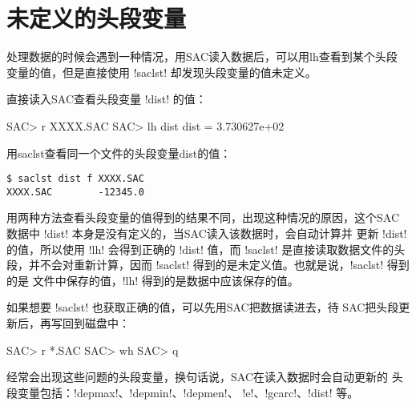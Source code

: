 \section{未定义的头段变量}
处理数据的时候会遇到一种情况，用SAC读入数据后，可以用lh查看到某个头段
变量的值，但是直接使用 !saclst! 却发现头段变量的值未定义。

直接读入SAC查看头段变量 !dist! 的值：
\begin{SACCode}
SAC> r XXXX.SAC
SAC> lh dist
     dist = 3.730627e+02
\end{SACCode}

用saclst查看同一个文件的头段变量dist的值：
\begin{verbatim}
$ saclst dist f XXXX.SAC
XXXX.SAC        -12345.0
\end{verbatim}

用两种方法查看头段变量的值得到的结果不同，出现这种情况的原因，这个SAC
数据中 !dist! 本身是没有定义的，当SAC读入该数据时，会自动计算并
更新 !dist! 的值，所以使用 !lh! 会得到正确的 !dist!
值，而 !saclst! 是直接读取数据文件的头段，并不会对重新计算，因而
!saclst! 得到的是未定义值。也就是说，!saclst! 得到的是
文件中保存的值，!lh! 得到的是数据中应该保存的值。

如果想要 !saclst! 也获取正确的值，可以先用SAC把数据读进去，待
SAC把头段更新后，再写回到磁盘中：
\begin{SACCode}
SAC> r *.SAC
SAC> wh
SAC> q
\end{SACCode}

经常会出现这些问题的头段变量，换句话说，SAC在读入数据时会自动更新的
头段变量包括：!depmax!、!depmin!、!depmen!、
!e!、!gcarc!、!dist! 等。
